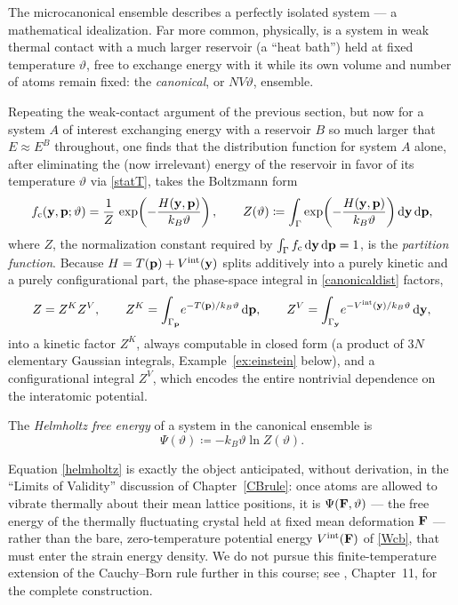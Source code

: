 The microcanonical ensemble describes a perfectly isolated system --- a mathematical idealization. Far more common, physically, is a system in weak thermal contact with a much larger reservoir (a ``heat bath'') held at fixed temperature $\vartheta$, free to exchange energy with it while its own volume and number of atoms remain fixed: the \textit{canonical}, or $NV\vartheta$, ensemble.

Repeating the weak-contact argument of the previous section, but now for a system $A$ of interest exchanging energy with a reservoir $B$ so much larger that $E\approx E^B$ throughout, one finds that the distribution function for system $A$ alone, after eliminating the (now irrelevant) energy of the reservoir in favor of its temperature $\vartheta$ via \eqref{statT}, takes the Boltzmann form
\begin{equation}\label{canonicaldist}
	f_{\rm c}(\mathbf{y},\mathbf{p};\vartheta) = \frac1{Z}\,\exp\!\left(-\frac{H(\mathbf{y},\mathbf{p})}{k_B\vartheta}\right), \qquad Z(\vartheta) \coloneqq \int_\Gamma \exp\!\left(-\frac{H(\mathbf{y},\mathbf{p})}{k_B\vartheta}\right)\mathrm{d}\mathbf{y}\,\mathrm{d}\mathbf{p},
\end{equation}
where $Z$, the normalization constant required by $\int_\Gamma f_{\rm c}\,\mathrm{d}\mathbf{y}\,\mathrm{d}\mathbf{p}=1$, is the \textit{partition function}. Because $H=T(\mathbf{p})+V^{\rm int}(\mathbf{y})$ splits additively into a purely kinetic and a purely configurational part, the phase-space integral in \eqref{canonicaldist} factors,
\begin{equation}\label{Zfactor}
	Z = Z^K Z^V, \qquad Z^K = \int_{\Gamma_{\mathbf{p}}}\!e^{-T(\mathbf{p})/k_B\vartheta}\,\mathrm{d}\mathbf{p}, \qquad Z^V = \int_{\Gamma_{\mathbf{y}}}\!e^{-V^{\rm int}(\mathbf{y})/k_B\vartheta}\,\mathrm{d}\mathbf{y},
\end{equation}
into a kinetic factor $Z^K$, always computable in closed form (a product of $3N$ elementary Gaussian integrals, Example~\ref{ex:einstein} below), and a configurational integral $Z^V$, which encodes the entire nontrivial dependence on the interatomic potential.

\begin{definition}
	The \textit{Helmholtz free energy} of a system in the canonical ensemble is
	\begin{equation}\label{helmholtz}
		\Psi(\vartheta) \coloneqq -k_B\vartheta\ln Z(\vartheta).
	\end{equation}
\end{definition}

\begin{remark}\label{rem:helmforward}
	Equation \eqref{helmholtz} is exactly the object anticipated, without derivation, in the ``Limits of Validity'' discussion of Chapter~\ref{CBrule}: once atoms are allowed to vibrate thermally about their mean lattice positions, it is $\Psi(\mathbf{F},\vartheta)$ --- the free energy of the thermally fluctuating crystal held at fixed mean deformation $\mathbf{F}$ --- rather than the bare, zero-temperature potential energy $V^{\rm int}(\mathbf{F})$ of \eqref{Wcb}, that must enter the strain energy density. We do not pursue this finite-temperature extension of the Cauchy--Born rule further in this course; see \cite{TadmorMiller}, Chapter~11, for the complete construction.
\end{remark}

